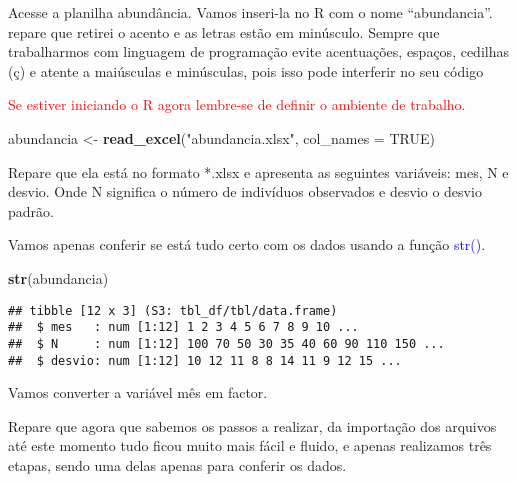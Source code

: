 \documentclass[14pt,titlepage, oneside, openany, a4paper]{book}
\newenvironment{Shaded}{\begin{snugshade}}{\end{snugshade}}
\newcommand{\DataTypeTok}[1]{\textcolor[rgb]{0.13,0.29,0.53}{#1}}
\newcommand{\KeywordTok}[1]{\textcolor[rgb]{0.13,0.29,0.53}{\textbf{#1}}}
\newcommand{\NormalTok}[1]{#1}
\newcommand{\OperatorTok}[1]{\textcolor[rgb]{0.81,0.36,0.00}{\textbf{#1}}}
\newcommand{\OtherTok}[1]{\textcolor[rgb]{0.56,0.35,0.01}{#1}}
\newcommand{\StringTok}[1]{\textcolor[rgb]{0.31,0.60,0.02}{#1}}
\begin{document}
Acesse a planilha abundância. Vamos inseri-la no R com o nome ``abundancia''. repare que retirei o acento e as letras estão em minúsculo. Sempre que trabalharmos com linguagem de programação evite acentuações, espaços, cedilhas (ç) e atente a maiúsculas e minúsculas, pois isso pode interferir no seu código

\textcolor{red}{Se estiver iniciando o R agora lembre-se de definir o ambiente de trabalho.}

\begin{Shaded}
\begin{Highlighting}[]
\NormalTok{abundancia <-}\StringTok{ }\KeywordTok{read_excel}\NormalTok{(}\StringTok{"abundancia.xlsx"}\NormalTok{, }\DataTypeTok{col_names =} \OtherTok{TRUE}\NormalTok{)}
\end{Highlighting}
\end{Shaded}

Repare que ela está no formato *.xlsx e apresenta as seguintes variáveis: mes, N e desvio. Onde N significa o número de indivíduos observados e desvio o desvio padrão.

Vamos apenas conferir se está tudo certo com os dados usando a função \textcolor{blue}{str()}.

\begin{Shaded}
\begin{Highlighting}[]
\KeywordTok{str}\NormalTok{(abundancia)}
\end{Highlighting}
\end{Shaded}

\begin{verbatim}
## tibble [12 x 3] (S3: tbl_df/tbl/data.frame)
##  $ mes   : num [1:12] 1 2 3 4 5 6 7 8 9 10 ...
##  $ N     : num [1:12] 100 70 50 30 35 40 60 90 110 150 ...
##  $ desvio: num [1:12] 10 12 11 8 8 14 11 9 12 15 ...
\end{verbatim}

Vamos converter a variável mês em factor.

\begin{Shaded}
\end{Shaded}

Repare que agora que sabemos os passos a realizar, da importação dos arquivos até este momento tudo ficou muito mais fácil e fluido, e apenas realizamos três etapas, sendo uma delas apenas para conferir os dados.
\end{document}
